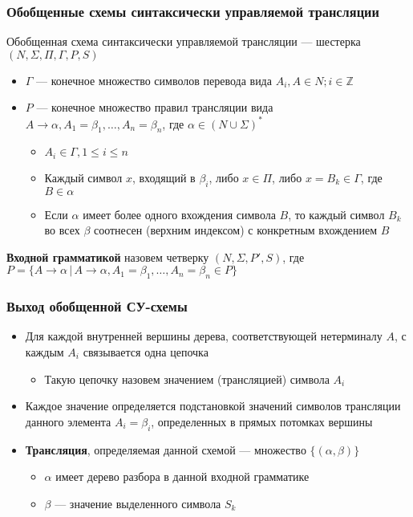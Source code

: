 \documentclass{beamer}
\begin{document}
\begin{frame}[fragile]
  \transwipe[direction=90]
  \frametitle{Обобщенные схемы синтаксически управляемой трансляции}

  \begin{center}
    Обобщенная схема синтаксически управляемой трансляции --- шестерка $(N, \Sigma, \Pi, \Gamma, P, S)$  
  \end{center}

  \begin{itemize}
    \item $\Gamma$ --- конечное множество символов перевода вида $A_i, A \in N; i \in \mathbb{Z}$
    \item $P$ --- конечное множество правил трансляции вида $A \rightarrow 	\alpha, A_1 = \beta_1, \dots, A_n = \beta_n$, где $\alpha \in (N \cup \Sigma)^*$
    \begin{itemize}
      \item $A_i \in \Gamma, 1 \leq i \leq n$
      \item Каждый символ $x$, входящий в $\beta_i$, либо $x \in \Pi$, либо $x = B_k \in \Gamma$, где $B \in \alpha$
      \item Если $\alpha$ имеет более одного вхождения символа $B$, то каждый символ $B_k$ во всех $\beta$ соотнесен (верхним индексом) с конкретным вхождением $B$
    \end{itemize}
  \end{itemize}
  

  \begin{center}
    \textbf{Входной грамматикой} назовем четверку $(N, \Sigma, P', S)$, где $P = \{ A \rightarrow \alpha \, | \, A \rightarrow \alpha, A_1 = \beta_1, \dots, A_n = \beta_n \in P  \}$
  \end{center}
\end{frame}

\begin{frame}[fragile]
  \transwipe[direction=90]
  \frametitle{Выход обобщенной СУ-схемы}
  \begin{itemize}
    \item Для каждой внутренней вершины дерева, соответствующей нетерминалу $A$, с каждым $A_i$ связывается одна цепочка 
    \begin{itemize}
      \item Такую цепочку назовем значением (трансляцией) символа $A_i$
    \end{itemize}     
    \item Каждое значение определяется подстановкой значений символов трансляции данного элемента $A_i = \beta_i$, определенных в прямых потомках вершины
    \item \textbf{Трансляция}, определяемая данной схемой --- множество $\{(\alpha, \beta)\}$
    \begin{itemize}
      \item $\alpha$ имеет дерево разбора в данной входной грамматике
      \item $\beta$ --- значение выделенного символа $S_k$
    \end{itemize}
  \end{itemize}

\end{frame}
\end{document}
